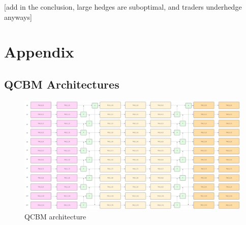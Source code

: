 \documentclass[12pt]{article}
\numberwithin{equation}{section}
\begin{document}
[add in the conclusion, large hedges are suboptimal, and traders underhedge anyways]

\clearpage
\section{Appendix}
\subsection{QCBM Architectures}

\begin{figure}[h!]
    \centering
    \includegraphics[scale=0.3, angle=270, width=\textwidth-209]{qcbm1.png}
    \caption{QCBM architecture}
\end{figure}
\clearpage


\printbibliography
\end{document}
